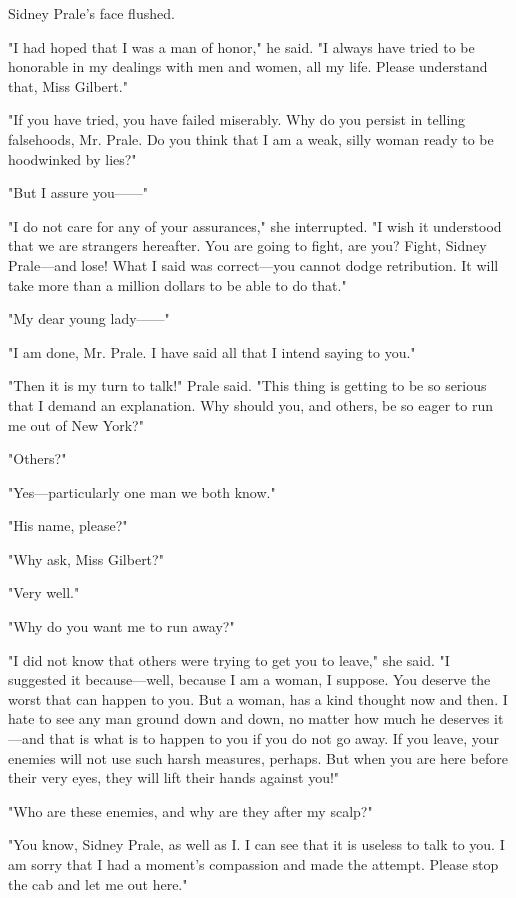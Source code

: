 \documentclass{novel}
\begin{document}
Sidney Prale's face flushed.

"I had hoped that I was a man of honor," he said. "I always have tried to be honorable in my dealings with men and women, all my life. Please understand that, Miss Gilbert."

"If you have tried, you have failed miserably. Why do you persist in telling falsehoods, Mr. Prale. Do you think that I am a weak, silly woman ready to be hoodwinked by lies?"

"But I assure you------"

"I do not care for any of your assurances," she interrupted. "I wish it understood that we are strangers hereafter. You are going to fight, are you? Fight, Sidney Prale---and lose! What I said was correct---you cannot dodge retribution. It will take more than a million dollars to be able to do that."

"My dear young lady------"

"I am done, Mr. Prale. I have said all that I intend saying to you."

"Then it is my turn to talk!" Prale said. "This thing is getting to be so serious that I demand an explanation. Why should you, and others, be so eager to run me out of New York?"

"Others?"

"Yes---particularly one man we both know."

"His name, please?"

"Why ask, Miss Gilbert?"

"Very well."

"Why do you want me to run away?"

"I did not know that others were trying to get you to leave," she said. "I suggested it because---well, because I am a woman, I suppose. You deserve the worst that can happen to you. But a woman, has a kind thought now and then. I hate to see any man ground down and down, no matter how much he deserves it---and that is what is to happen to you if you do not go away. If you leave, your enemies will not use such harsh measures, perhaps. But when you are here before their very eyes, they will lift their hands against you!"

"Who are these enemies, and why are they after my scalp?"

"You know, Sidney Prale, as well as I. I can see that it is useless to talk to you. I am sorry that I had a moment's compassion and made the attempt. Please stop the cab and let me out here."
\end{document}
